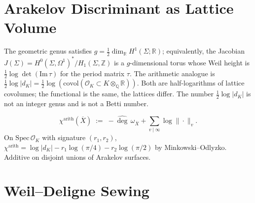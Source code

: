 \section{Arakelov Discriminant as Lattice Volume}
\label{v4-arith:segal:genus}

\begin{observation}
\label{v4-arith:obs:genus-lattice-volume}
The geometric genus satisfies \(g=\tfrac{1}{2}\dim_{\mathbb{R}}H^{1}(\Sigma;\mathbb{R})\); equivalently, the Jacobian \(J(\Sigma)=H^{0}(\Sigma,\Omega^{1})^{*}/H_{1}(\Sigma,\mathbb{Z})\) is a \(g\)-dimensional torus whose Weil height is \(\tfrac{1}{2}\log\det(\mathrm{Im}\,\tau)\) for the period matrix \(\tau\).
The arithmetic analogue is \(\tfrac{1}{2}\log|d_{K}|=\tfrac{1}{2}\log(\mathrm{covol}(\mathcal{O}_{K}\subset K\otimes_{\mathbb{Q}}\mathbb{R}))\).
Both are half-logarithms of lattice covolumes; the functional is the same, the lattices differ. The number \(\tfrac{1}{2}\log|d_{K}|\) is not an integer genus and is not a Betti number.
\end{observation}

\begin{definition}
\label{v4-arith:def:arithmetic-euler-characteristic}
\begin{equation}
\chi^{\mathrm{arith}}(\overline{X})\;:=\;-\widehat{\deg}\,\omega_{\overline{X}}+\sum_{v\mid\infty}\log\|\cdot\|_{v}.
\end{equation}
On \(\mathrm{Spec}\,\mathcal{O}_{K}\) with signature \((r_{1},r_{2})\),
\(\chi^{\mathrm{arith}}=\log|d_{K}|-r_{1}\log(\pi/4)-r_{2}\log(\pi/2)\)
by Minkowski--Odlyzko. Additive on disjoint unions of Arakelov
surfaces.
\end{definition}

\section{Weil--Deligne Sewing}
\label{v4-arith:segal:weil-deligne-sewing}

